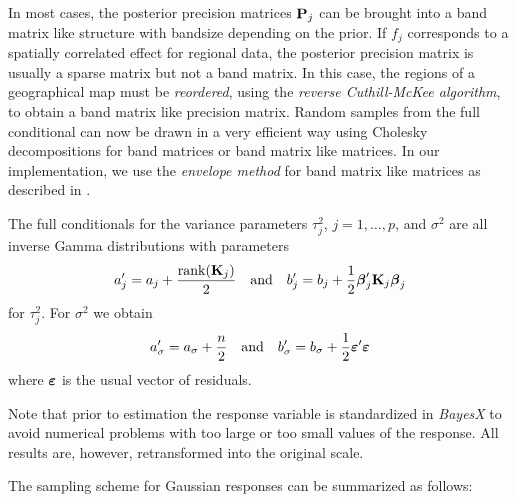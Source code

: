 \documentclass[11pt,a4paper,twoside]{bayesxarticle}
\begin{document}
In most cases, the posterior precision matrices $\mathbf{P}_j$ can be brought into a band matrix like structure with bandsize
depending on the prior. If $f_j$ corresponds to a spatially correlated effect for regional data, the posterior precision matrix
is usually a sparse matrix but not a band matrix. In this case, the regions of a geographical map must be {\em reordered},
using the {\em reverse Cuthill-McKee algorithm}, to obtain a band matrix like precision matrix. Random samples from the full
conditional can now be drawn in a very efficient way using Cholesky decompositions for band matrices or band matrix like
matrices. In our implementation, we use the {\em envelope method} for band matrix like matrices as described in
.

The full conditionals for the variance parameters $\tau^2_j$,
$j=1,\dots,p$, and $\sigma^2$ are all inverse Gamma distributions
with parameters
\begin{equation}
\label{hypab} a_j' = a_j + \frac{\mathrm{rank}(\Kvec_j)}{2} \quad
\mbox{and} \quad b_j' = b_j + \frac{1}{2} \betavec_j'\Kvec_j \betavec_j
\end{equation}
for $\tau^2_j$. For $\sigma^2$ we obtain
\begin{equation}
\label{hypabsigma} a_{\sigma}' = a_{\sigma}+\frac{n}{2} \quad
\mbox{and} \quad b_{\sigma}' = b_{\sigma} + \frac{1}{2}
\varepsilonvec'\varepsilonvec
\end{equation}
where $\boldsymbol{\varepsilon}$ is the usual vector of residuals.

Note that prior to estimation the response variable is standardized
in {\em BayesX} to avoid numerical problems with too large or too
small values of the response. All results are, however,
retransformed into the original scale.

The sampling scheme for Gaussian responses can be summarized as
follows:
\end{document}
